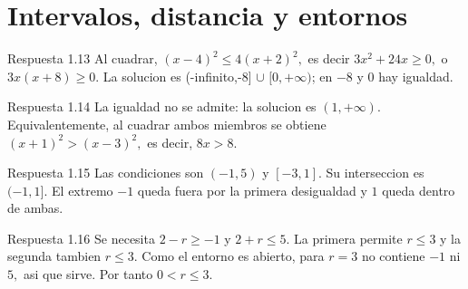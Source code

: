 \documentclass[10pt,a4paper,oneside,openany]{book}
\begin{document}
\section{Intervalos, distancia y entornos}
\begin{PSevenAnswerFixed}{Respuesta 1.13}
Al cuadrar, \((x-4)^{2}\le 4(x+2)^{2},\) es decir \(3x^{2}+24x\ge 0,\) o \(3x(x+8)\ge 0\). La solucion es (-infinito,-8] \(\cup \) \([0,+\infty )\); en \(-8\) y \(0\) hay igualdad.
\end{PSevenAnswerFixed}
\begin{PSevenAnswerFixed}{Respuesta 1.14}
La igualdad no se admite: la solucion es \((1,+\infty )\). Equivalentemente, al cuadrar ambos miembros se obtiene \((x+1)^{2}>(x-3)^{2},\) es decir, \(8x>8\).
\end{PSevenAnswerFixed}
\begin{PSevenAnswerFixed}{Respuesta 1.15}
Las condiciones son \((-1,5)\) y \([-3,1]\). Su interseccion es \((-1,1]\). El extremo \(-1\) queda fuera por la primera desigualdad y \(1\) queda dentro de ambas.
\end{PSevenAnswerFixed}
\begin{PSevenAnswerFixed}{Respuesta 1.16}
Se necesita \(2-r\ge -1\) y \(2+r\le 5\). La primera permite \(r\le 3\) y la segunda tambien \(r\le 3\). Como el entorno es abierto, para \(r=3\) no contiene \(-1\) ni \(5,\) asi que sirve. Por tanto \(0<r\le 3\).
\end{PSevenAnswerFixed}
\end{document}
